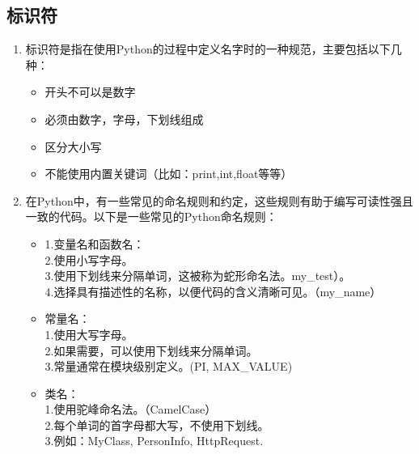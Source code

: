 
\subsection{标识符}

\begin{enumerate}
\item 标识符是指在使用Python的过程中定义名字时的一种规范，主要包括以下几种：
\begin{itemize}
\item 开头不可以是数字
\item 必须由数字，字母，下划线组成
\item 区分大小写
\item 不能使用内置关键词（比如：print,int,float等等）
\end{itemize}
\item 在Python中，有一些常见的命名规则和约定，这些规则有助于编写可读性强且一致的代码。以下是一些常见的Python命名规则：
\begin{itemize}
\item
1.变量名和函数名：\\
2.使用小写字母。\\
3.使用下划线来分隔单词，这被称为蛇形命名法。my_test）。\\
4.选择具有描述性的名称，以便代码的含义清晰可见。（my_name）

\item 常量名：\\
1.使用大写字母。\\
2.如果需要，可以使用下划线来分隔单词。\\
3.常量通常在模块级别定义。(PI, MAX_VALUE)\\
\item 类名：\\
1.使用驼峰命名法。（CamelCase）\\
2.每个单词的首字母都大写，不使用下划线。\\
3.例如：MyClass, PersonInfo, HttpRequest.
\end{itemize}
\end{enumerate}